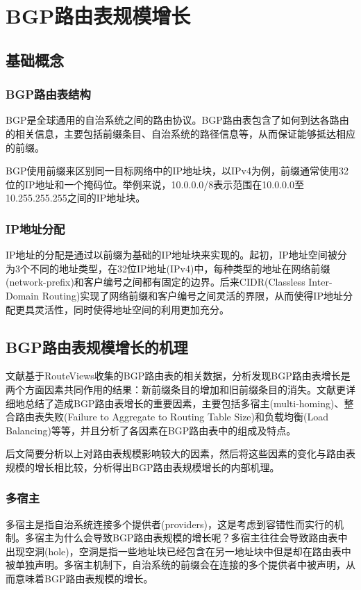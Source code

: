 \documentclass[11pt,twocolumn]{article}
\begin{document}
\section{BGP路由表规模增长}
\subsection{基础概念}
\subsubsection{BGP路由表结构}
BGP是全球通用的自治系统之间的路由协议。BGP路由表包含了如何到达各路由的相关信息，主要包括前缀条目、自治系统的路径信息等，从而保证能够抵达相应的前缀。

BGP使用前缀来区别同一目标网络中的IP地址块，以IPv4为例，前缀通常使用32位的IP地址和一个掩码位\cite{IPv4}。举例来说，10.0.0.0/8表示范围在10.0.0.0至10.255.255.255之间的IP地址块。

\subsubsection{IP地址分配}
IP地址的分配是通过以前缀为基础的IP地址块来实现的。起初，IP地址空间被分为3个不同的地址类型，在32位IP地址(IPv4)中，每种类型的地址在网络前缀(network-prefix)和客户编号之间都有固定的边界\cite{IPv4}。后来CIDR(Classless Inter-Domain Routing)实现了网络前缀和客户编号之间灵活的界限，从而使得IP地址分配更具灵活性，同时使得地址空间的利用更加充分。

\subsection{BGP路由表规模增长的机理}
文献\cite{IPv4}基于RouteViews收集的BGP路由表的相关数据，分析发现BGP路由表增长是两个方面因素共同作用的结果：新前缀条目的增加和旧前缀条目的消失。文献\cite{RTG}更详细地总结了造成BGP路由表增长的重要因素，主要包括多宿主(multi-homing)、整合路由表失败(Failure to Aggregate to Routing Table Size)和负载均衡(Load Balancing)等等，并且分析了各因素在BGP路由表中的组成及特点。

后文简要分析以上对路由表规模影响较大的因素，然后将这些因素的变化与路由表规模的增长相比较，分析得出BGP路由表规模增长的内部机理。

\subsubsection{多宿主}
多宿主是指自治系统连接多个提供者(providers)，这是考虑到容错性而实行的机制。多宿主为什么会导致BGP路由表规模的增长呢？多宿主往往会导致路由表中出现空洞(hole)，空洞是指一些地址块已经包含在另一地址块中但是却在路由表中被单独声明。多宿主机制下，自治系统的前缀会在连接的多个提供者中被声明，从而意味着BGP路由表规模的增长。
\end{document}
